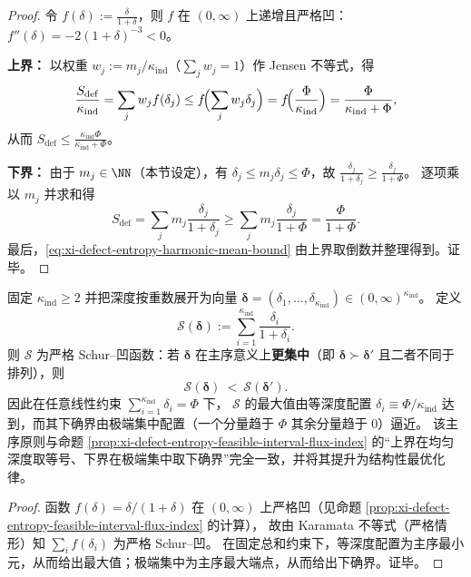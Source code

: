 \begin{proof}
令 \(f(\delta):=\frac{\delta}{1+\delta}\)，则 \(f\) 在 \((0,\infty)\) 上递增且严格凹：
\(
f''(\delta)=-2(1+\delta)^{-3}<0
\)。
\par
\textbf{上界：}
以权重 \(w_j:=m_j/\kappa_{\mathrm{ind}}\)（\(\sum_j w_j=1\)）作 Jensen 不等式，得
\[
\frac{S_{\mathrm{def}}}{\kappa_{\mathrm{ind}}}
=\sum_{j}w_j f(\delta_j)
\le f\!\Bigl(\sum_j w_j\delta_j\Bigr)
=f\!\Bigl(\frac{\Phi}{\kappa_{\mathrm{ind}}}\Bigr)
=\frac{\Phi}{\kappa_{\mathrm{ind}}+\Phi},
\]
从而 \(S_{\mathrm{def}}\le \frac{\kappa_{\mathrm{ind}}\Phi}{\kappa_{\mathrm{ind}}+\Phi}\)。
\par
\textbf{下界：}
由于 \(m_j\in\NN\)（本节设定），有 \(\delta_j\le m_j\delta_j\le \Phi\)，故
\(
\frac{\delta_j}{1+\delta_j}\ge \frac{\delta_j}{1+\Phi}
\)。
逐项乘以 \(m_j\) 并求和得
\[
S_{\mathrm{def}}
=\sum_j m_j\frac{\delta_j}{1+\delta_j}
\ge \sum_j m_j\frac{\delta_j}{1+\Phi}
=\frac{\Phi}{1+\Phi}.
\]
最后，\eqref{eq:xi-defect-entropy-harmonic-mean-bound} 由上界取倒数并整理得到。证毕。
\end{proof}

\begin{proposition}\label{prop:xi-defect-entropy-schur-concavity}
固定 \(\kappa_{\mathrm{ind}}\ge 2\) 并把深度按重数展开为向量
\(\boldsymbol{\delta}=(\delta_1,\dots,\delta_{\kappa_{\mathrm{ind}}})\in(0,\infty)^{\kappa_{\mathrm{ind}}}\)。
定义
\[
\mathcal{S}(\boldsymbol{\delta})
:=\sum_{i=1}^{\kappa_{\mathrm{ind}}}\frac{\delta_i}{1+\delta_i}.
\]
则 \(\mathcal{S}\) 为严格 Schur--凹函数：若 \(\boldsymbol{\delta}\) 在主序意义上\textbf{更集中}（即 \(\boldsymbol{\delta}\succ \boldsymbol{\delta}'\) 且二者不同于排列），则
\[
\mathcal{S}(\boldsymbol{\delta})\ <\ \mathcal{S}(\boldsymbol{\delta}').
\]
因此在任意线性约束 \(\sum_{i=1}^{\kappa_{\mathrm{ind}}}\delta_i=\Phi\) 下，
\(\mathcal{S}\) 的最大值由等深度配置 \(\delta_i\equiv \Phi/\kappa_{\mathrm{ind}}\) 达到，而其下确界由极端集中配置（一个分量趋于 \(\Phi\) 其余分量趋于 \(0\)）逼近。
该主序原则与命题 \ref{prop:xi-defect-entropy-feasible-interval-flux-index} 的“上界在均匀深度取等号、下界在极端集中取下确界”完全一致，并将其提升为结构性最优化律。
\end{proposition}
\begin{proof}
函数 \(f(\delta)=\delta/(1+\delta)\) 在 \((0,\infty)\) 上严格凹（见命题 \ref{prop:xi-defect-entropy-feasible-interval-flux-index} 的计算），
故由 Karamata 不等式（严格情形）知 \(\sum_i f(\delta_i)\) 为严格 Schur--凹。
在固定总和约束下，等深度配置为主序最小元，从而给出最大值；极端集中为主序最大端点，从而给出下确界。证毕。
\end{proof}


